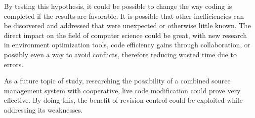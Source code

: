 \documentclass[11pt]{article}
\begin{document}
By testing this hypothesis, it could be possible to change the way coding is completed if the results are favorable. It is possible that other inefficiencies can be discovered and addressed that were unexpected or otherwise little known. The direct impact on the field of computer science could be great, with new research in environment optimization tools, code efficiency gains through collaboration, or possibly even a way to avoid conflicts, therefore reducing wasted time due to errors.

As a future topic of study, researching the possibility of a combined source management system with cooperative, live code modification could prove very effective. By doing this, the benefit of revision control could be exploited while addressing its weaknesses.  



\end{document}
